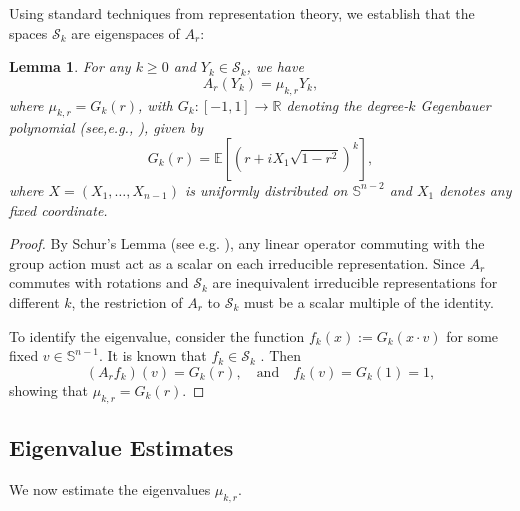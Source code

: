 \documentclass[11pt]{article}
\newtheorem{lemma}[theorem]{Lemma}
\begin{document}
\smallskip
Using standard techniques from representation theory, we establish that the spaces $\mathcal{S}_k$ are eigenspaces of $A_r$:

\begin{lemma}\label{lem: eigenspace}
For any $k \geq 0$ and $Y_k \in \mathcal{S}_k$, we have
\[
A_r(Y_k) = \mu_{k,r} Y_k,
\]
where $\mu_{k,r} = G_k(r)$, with $G_k : [-1,1] \to \mathbb{R}$ denoting the degree-$k$ Gegenbauer polynomial (see,e.g., \cite{muller2006spherical}), given by
\[
G_k(r) = \mathbb{E} \left[ \left( r + i X_1 \sqrt{1 - r^2} \right)^k \right],
\]
where $X = (X_1, \dotsc, X_{n-1})$ is uniformly distributed on $\mathbb{S}^{n-2}$ and $X_1$ denotes any fixed coordinate.
\end{lemma}

\begin{proof}
By Schur’s Lemma (see e.g. \cite{serre1977linear}), any linear operator commuting with the group action must act as a scalar on each irreducible representation. Since $A_r$ commutes with rotations and $\mathcal{S}_k$ are inequivalent irreducible representations for different $k$, the restriction of $A_r$ to $\mathcal{S}_k$ must be a scalar multiple of the identity.

To identify the eigenvalue, consider the function $f_k(x) := G_k(x \cdot v)$ for some fixed $v \in \mathbb{S}^{n-1}$. It is known that $f_k \in \mathcal{S}_k$ \cite{muller2006spherical}. Then
\[
(A_r f_k)(v) = G_k(r), \quad \text{and} \quad f_k(v) = G_k(1) = 1,
\]
showing that $\mu_{k,r} = G_k(r)$.
\end{proof}

\subsection{Eigenvalue Estimates}
We now estimate the eigenvalues $\mu_{k,r}$.
\end{document}
